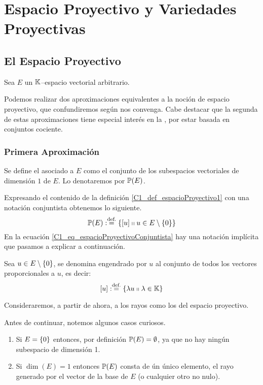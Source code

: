\chapter{Espacio Proyectivo y Variedades Proyectivas}
\label{C1}
\section{El Espacio Proyectivo}
\label{C1_espacioProyectivo}
Sea $E$ un $\mathbb{K}$--espacio vectorial arbitrario.

Podemos realizar dos aproximaciones equivalentes a la noción de espacio proyectivo, que confundiremos según nos convenga. Cabe destacar que la segunda de estas aproximaciones tiene especial interés en la , por estar basada en conjuntos cociente.
\subsection{Primera Aproximación}
\label{C1_S1_primeraAprox}
\begin{defi}
	\label{C1_def_espacioProyectivo1}
	Se define el  asociado a $E$ como el conjunto de los subespacios vectoriales de dimensión $1$ de $E$. Lo denotaremos por $\mathbb{P}(E)$.
\end{defi}
Expresando el contenido de la definición \ref{C1_def_espacioProyectivo1} con una notación conjuntista obtenemos lo siguiente.
\begin{equation}
\label{C1_eq_espacioProyectivoConjuntista}
	\mathbb{P}(E):\stackrel{\textrm{def.}}{=}\{\left [ u \right ]\shortparallel u\in E\setminus\{0\}\}
\end{equation}
En la ecuación \ref{C1_eq_espacioProyectivoConjuntista} hay una notación implícita que pasamos a explicar a continuación.
\begin{defi}[Rayo]
	\label{C1_def_rayo}
	Sea $u\in E\setminus\{0\}$, se denomina  engendrado por $u$ al conjunto de todos los vectores proporcionales a $u$, es decir:
	\[\left [ u \right ]:\stackrel{\textrm{def.}}{=}\{\lambda u\shortparallel \lambda\in\mathbb{K}\}\] 
\end{defi}
Consideraremos, a partir de ahora, a los rayos como los  del espacio proyectivo.

Antes de continuar, notemos algunos casos curiosos.
\begin{obs}
	\label{C1_obs_casosExtremos}
	\begin{enumerate}
		\item Si $E=\{0\}$ entonces, por definición $\mathbb{P}(E)=\emptyset$, ya que no hay ningún subespacio de dimensión 1.
		\item Si $\dim(E)=1$ entonces $\mathbb{P}(E)$ consta de ún único elemento, el rayo generado por el vector de la base de $E$ (o cualquier otro no nulo).
	\end{enumerate}
\end{obs}
